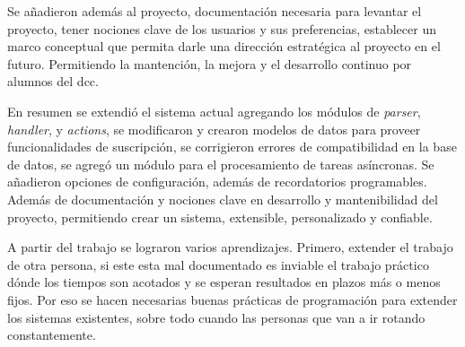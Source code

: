     \par Se añadieron además al proyecto, documentación necesaria para levantar el proyecto, tener nociones clave de los usuarios y sus preferencias, establecer un marco conceptual que permita darle una dirección estratégica al proyecto en el futuro. Permitiendo la mantención, la mejora y el desarrollo continuo por alumnos del dcc.

    \par En resumen se extendió el sistema actual agregando los módulos de \textit{parser}, \textit{handler}, y \textit{actions}, se modificaron y crearon modelos de datos para proveer funcionalidades de suscripción, se corrigieron errores de compatibilidad en la base de datos, se agregó un módulo para el procesamiento de tareas asíncronas. Se añadieron opciones de configuración, además de recordatorios programables. Además de documentación y nociones clave en desarrollo y mantenibilidad del proyecto, permitiendo crear un sistema, extensible, personalizado y confiable.

    \par A partir del trabajo se lograron varios aprendizajes. Primero, extender el trabajo de otra persona, si este esta mal documentado es inviable el trabajo práctico dónde los tiempos son acotados y se esperan resultados en plazos más o menos fijos. Por eso se hacen necesarias buenas prácticas de programación para extender los sistemas existentes, sobre todo cuando las personas que van a ir rotando constantemente.

